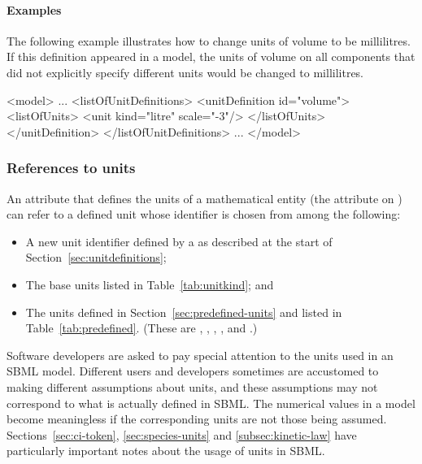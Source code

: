 \paragraph{Examples}

The following example illustrates how to change  units
of volume to be millilitres.  If this definition appeared in a
model, the units of volume on all components that did not
explicitly specify different units would be changed to
millilitres.
\begin{example}
<model>
    ...
    <listOfUnitDefinitions>
        <unitDefinition id="volume">
            <listOfUnits>
                <unit kind="litre" scale="-3"/>
            </listOfUnits>
        </unitDefinition>
    </listOfUnitDefinitions>
    ...
</model>
\end{example}


\subsubsection{References to units}

An attribute that defines the units of a mathematical entity (\eg the
attribute  on \Parameter) can refer to a defined unit
whose identifier is chosen from among the following:
\begin{itemize}
  
\item A new unit identifier defined by a \UnitDefinition as
  described at the start of Section~\ref{sec:unitdefinitions};

\item The base units listed in Table~\vref{tab:unitkind}; and
  
\item The  units defined in
  Section~\ref{sec:predefined-units} and listed in
  Table~\ref{tab:predefined}.  (These are ,
  , , , and .)

\end{itemize}

Software developers are asked to pay special attention to the
units used in an SBML model.  Different users and developers
sometimes are accustomed to making different assumptions about
units, and these assumptions may not correspond to what is
actually defined in SBML.  The numerical values in a model become
meaningless if the corresponding units are not those being
assumed.  Sections~\ref{sec:ci-token}, \ref{sec:species-units} and
\ref{subsec:kinetic-law} have particularly important notes about
the usage of units in SBML.


